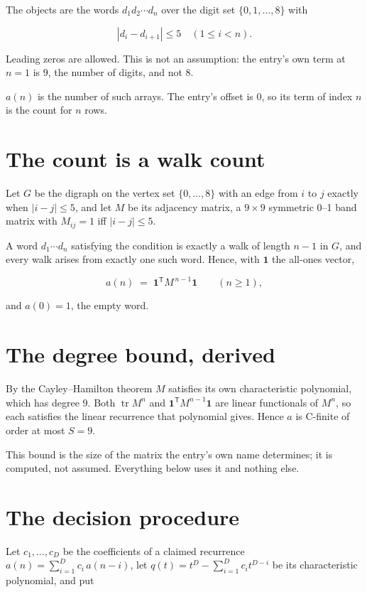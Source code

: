 \documentclass[11pt]{article}
\theoremstyle{definition}
\begin{document}
The objects are the words $d_1 d_2 \cdots d_n$ over the digit set $\{0,1,\dots,8\}$ with

\[|d_i - d_{i+1}| \le 5\quad (1 \le i < n).\]

Leading zeros are allowed. This is not an assumption: the entry's own term at $n=1$ is $9$, the number of digits, and not $8$.

$a(n)$ is the number of such arrays. The entry's offset is 0, so its term of index $n$ is the count for $n$ rows.

\section{The count is a walk count}

Let $G$ be the digraph on the vertex set $\{0,\dots,8\}$ with an edge from $i$ to $j$ exactly when $|i-j| \le 5$, and let $M$ be its adjacency matrix, a $9 \times 9$ symmetric 0--1 band matrix with $M_{ij} = 1$ iff $|i-j| \le 5$.

A word $d_1\cdots d_n$ satisfying the condition is exactly a walk of length $n-1$ in $G$, and every walk arises from exactly one such word. Hence, with $\mathbf 1$ the all-ones vector,

\[a(n) \;=\; \mathbf 1^{\mathsf T} M^{\,n-1} \mathbf 1 \qquad (n \ge 1),\]

and $a(0) = 1$, the empty word.

\section{The degree bound, derived}

By the Cayley--Hamilton theorem $M$ satisfies its own characteristic polynomial, which has degree $9$. Both $\operatorname{tr} M^n$ and $\mathbf 1^{\mathsf T} M^{n-1} \mathbf 1$ are linear functionals of $M^{n}$, so each satisfies the linear recurrence that polynomial gives. Hence $a$ is C-finite of order at most $S = 9$.

This bound is the size of the matrix the entry's own name determines; it is computed, not assumed. Everything below uses it and nothing else.

\section{The decision procedure}

Let $c_1,\dots,c_D$ be the coefficients of a claimed recurrence $a(n) = \sum_{i=1}^{D} c_i\,a(n-i)$, let $q(t) = t^{D} - \sum_{i=1}^{D} c_i t^{D-i}$ be its characteristic polynomial, and put
\end{document}
